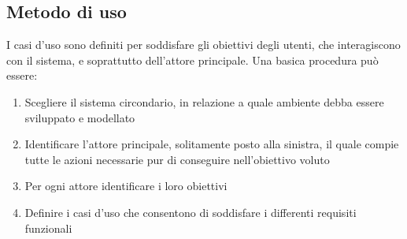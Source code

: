 \documentclass{article}
\begin{document}
\subsection*{Metodo di uso}
\large
I casi d'uso sono definiti per soddisfare gli obiettivi degli utenti, che interagiscono con il sistema, e soprattutto dell'attore principale. Una basica procedura può essere:
\begin{enumerate}
    \renewcommand{\labelenumi}{-}
    \itemsep0em
    \item Scegliere il sistema circondario, in relazione a quale ambiente debba essere sviluppato e modellato
    \item Identificare l'attore principale, solitamente posto alla sinistra, il quale compie tutte le azioni necessarie pur di conseguire nell'obiettivo voluto
    \item Per ogni attore identificare i loro obiettivi
    \item Definire i casi d'uso che consentono di soddisfare i differenti requisiti funzionali
\end{enumerate}
\end{document}
